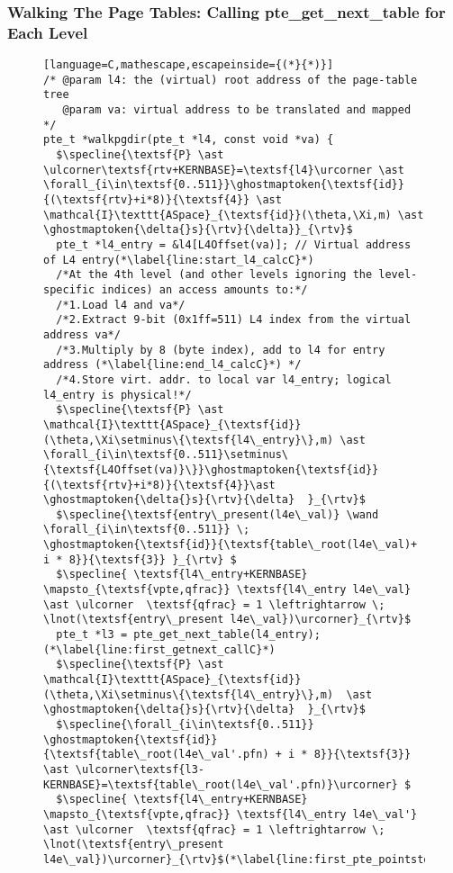 \subsubsection{Walking The Page Tables: Calling \textsf{pte\_get\_next\_table} for Each Level}
\label{wlkpgdirC}
\begin{figure}\footnotesize
\ifPLDI
\begin{lstlisting}[language=C,mathescape,escapeinside={(*}{*)}]
/* @param l4: the (virtual) root address of the page-table tree
   @param va: virtual address to be translated and mapped */
pte_t *walkpgdir(pte_t *l4, const void *va) {
  $\specline{\textsf{P} \ast \ulcorner\textsf{rtv+KERNBASE}=\textsf{l4}\urcorner \ast \forall_{i\in\textsf{0..511}}\ghostmaptoken{\textsf{id}}{(\textsf{rtv}+i*8)}{\textsf{4}} \ast \mathcal{I}\texttt{ASpace}_{\textsf{id}}(\theta,\Xi,m) \ast \ghostmaptoken{\delta{}s}{\rtv}{\delta}}_{\rtv}$
  pte_t *l4_entry = &l4[L4Offset(va)]; // Virtual address of L4 entry(*\label{line:start_l4_calcC}*)
  /*At the 4th level (and other levels ignoring the level-specific indices) an access amounts to:*/
  /*1.Load l4 and va*/
  /*2.Extract 9-bit (0x1ff=511) L4 index from the virtual address va*/
  /*3.Multiply by 8 (byte index), add to l4 for entry address (*\label{line:end_l4_calcC}*) */
  /*4.Store virt. addr. to local var l4_entry; logical l4_entry is physical!*/
  $\specline{\textsf{P} \ast \mathcal{I}\texttt{ASpace}_{\textsf{id}}(\theta,\Xi\setminus\{\textsf{l4\_entry}\},m) \ast \forall_{i\in\textsf{0..511}\setminus\{\textsf{L4Offset(va)}\}}\ghostmaptoken{\textsf{id}}{(\textsf{rtv}+i*8)}{\textsf{4}}\ast \ghostmaptoken{\delta{}s}{\rtv}{\delta}  }_{\rtv}$
  $\specline{\textsf{entry\_present(l4e\_val)} \wand \forall_{i\in\textsf{0..511}} \; \ghostmaptoken{\textsf{id}}{\textsf{table\_root(l4e\_val)+ i * 8}}{\textsf{3}} }_{\rtv} $
  $\specline{ \textsf{l4\_entry+KERNBASE} \mapsto_{\textsf{vpte,qfrac}} \textsf{l4\_entry l4e\_val} \ast \ulcorner  \textsf{qfrac} = 1 \leftrightarrow \; \lnot(\textsf{entry\_present l4e\_val})\urcorner}_{\rtv}$    
  pte_t *l3 = pte_get_next_table(l4_entry); (*\label{line:first_getnext_callC}*) 
  $\specline{\textsf{P} \ast \mathcal{I}\texttt{ASpace}_{\textsf{id}}(\theta,\Xi\setminus\{\textsf{l4\_entry}\},m)  \ast \ghostmaptoken{\delta{}s}{\rtv}{\delta}  }_{\rtv}$
  $\specline{\forall_{i\in\textsf{0..511}} \ghostmaptoken{\textsf{id}}{\textsf{table\_root(l4e\_val'.pfn) + i * 8}}{\textsf{3}}  \ast \ulcorner\textsf{l3-KERNBASE}=\textsf{table\_root(l4e\_val'.pfn)}\urcorner} $
  $\specline{ \textsf{l4\_entry+KERNBASE} \mapsto_{\textsf{vpte,qfrac}} \textsf{l4\_entry l4e\_val'} \ast \ulcorner  \textsf{qfrac} = 1 \leftrightarrow \; \lnot(\textsf{entry\_present l4e\_val})\urcorner}_{\rtv}$(*\label{line:first_pte_pointstoC}*)

\end{lstlisting}
\end{figure}
